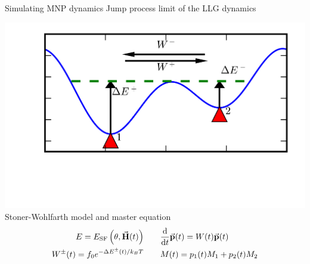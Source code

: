 \documentclass{sotonbeamer}
\begin{document}
\begin{frame}{Simulating MNP dynamics}
  Jump process limit of the LLG dynamics

  \includegraphics[scale=0.98]{figures/transitions.png}
  \vspace{-8mm}
  \center Stoner-Wohlfarth model and master equation
  \begin{align*}
    E = E_{\textup{SF}}\left( \theta, \va{H}(t)\right) \qquad
        &\dv{t} \va{p}(t) = W(t)\va{p}(t) \\
    W^\pm(t) = f_0e^{-\Delta E^\pm(t)/k_BT} \qquad
    & M(t) = p_1(t)M_1 + p_2(t)M_2
  \end{align*}
\end{frame}
\end{document}
